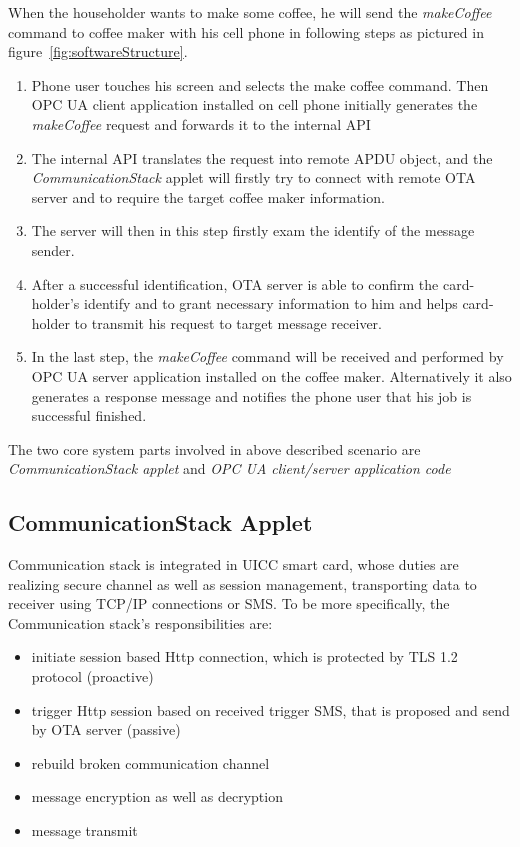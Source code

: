 When the householder wants to make some coffee, he will send the \emph{makeCoffee} command to coffee maker with his cell phone in following steps as pictured in figure~\ref{fig:softwareStructure}. 
\begin{enumerate}
\item Phone user touches his screen and selects the make coffee command. Then OPC UA client application installed on cell phone initially generates the \emph{makeCoffee} request and forwards it to the internal API
\item The internal API translates the request into remote APDU object, and the \emph{CommunicationStack} applet will firstly try to connect with remote OTA server and to require the target coffee maker information.
\item The server will then in this step firstly exam the identify of the message sender.
\item After a successful identification, OTA server is able to confirm the card-holder's identify and to grant necessary information to him and helps card-holder to transmit his request to target message receiver.
\item  In the last step, the \emph{makeCoffee} command will be received and performed by OPC UA server application installed on the coffee maker. Alternatively it also generates a response message and notifies the phone user that his job is successful  finished. 
\end{enumerate}
The two core system parts involved in above described scenario are \emph{CommunicationStack applet} and \emph{OPC UA client/server application code} 

\subsection{CommunicationStack Applet}
Communication stack is integrated in UICC smart card, whose duties are realizing secure channel as well as session management, transporting data to receiver using TCP/IP connections or SMS. To be more specifically, the Communication stack's responsibilities are:
\begin{itemize}
  \item initiate session based Http connection, which is protected by TLS 1.2 protocol  (proactive)
  \item trigger Http session based on received trigger SMS, that is proposed and send by OTA server (passive)
  \item rebuild broken communication channel
  \item message encryption as well as decryption
  \item message transmit
\end{itemize}

